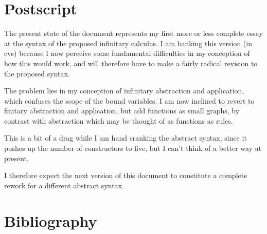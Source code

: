 
\section{Postscript}\label{POSTSCRIPT}

The present state of the document represents my first more or less complete essay at the syntax of the proposed infinitary calculus.
I am banking this version (in cvs) because I now perceive some fundamental difficulties in my conception of how this would work, and will therefore have to make a fairly radical revision to the proposed syntax.

The problem lies in my conception of infinitary abstraction and application, which confuses the scope of the bound variables.
I am now inclined to revert to finitary abstraction and application, but add functions as small graphs, by contrast with abstraction which may be thought of as functions as rules.

This is a bit of a drag while I am hand cranking the abstract syntax, since it pushes up the number of constructors to five, but I can't think of a better way at present.

I therefore expect the next version of this document to constitute a complete rework for a different abstract syntax.

\appendix

\vfill



\pagebreak

\section*{Bibliography}\label{BIBLIOGRAPHY}

{\def\section*#1{\ignore{#1}}
\raggedright


} %

{
{\small\printindex}}


